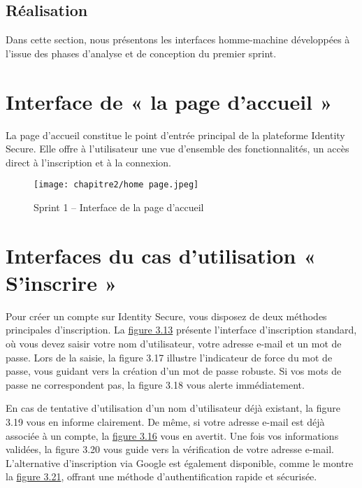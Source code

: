 \clearpage
\subsection{Réalisation}

Dans cette section, nous présentons les interfaces homme-machine développées à l'issue des phases d'analyse et de conception du premier sprint.
\section*{\textbf{Interface de « la page d'accueil »}}
La page d'accueil constitue le point d'entrée principal de la plateforme Identity Secure. Elle offre à l'utilisateur une vue d'ensemble des fonctionnalités, un accès direct à l'inscription et à la connexion.

\begin{figure}[H]
\centering
\texttt{[image: chapitre2/home page.jpeg]}
\caption{Sprint 1 – Interface de la page d'accueil}
\end{figure}

\section*{\textbf{Interfaces du cas d'utilisation « S'inscrire »}}

Pour créer un compte sur Identity Secure, vous disposez de deux méthodes principales d'inscription. La \hyperref[fig:3.13]{figure 3.13} présente l'interface d'inscription standard, où vous devez saisir votre nom d'utilisateur, votre adresse e-mail et un mot de passe. Lors de la saisie, la figure 3.17 illustre l'indicateur de force du mot de passe, vous guidant vers la création d'un mot de passe robuste. Si vos mots de passe ne correspondent pas, la figure 3.18 vous alerte immédiatement.

En cas de tentative d'utilisation d'un nom d'utilisateur déjà existant, la figure 3.19 vous en informe clairement. De même, si votre adresse e-mail est déjà associée à un compte, la \hyperref[fig:3.16]{figure 3.16} vous en avertit. Une fois vos informations validées, la figure 3.20 vous guide vers la vérification de votre adresse e-mail. L'alternative d'inscription via Google est également disponible, comme le montre la \hyperref[fig:3.21]{figure 3.21}, offrant une méthode d'authentification rapide et sécurisée.

